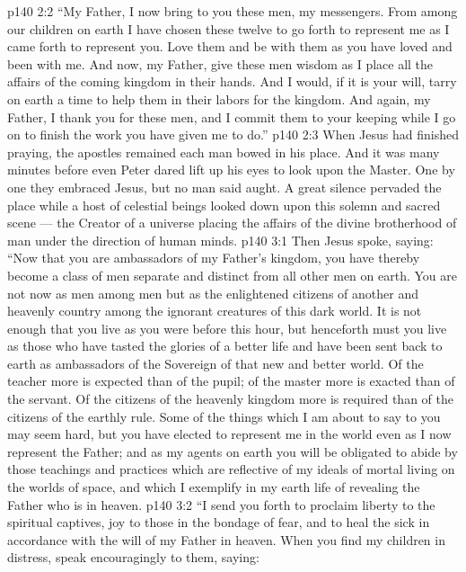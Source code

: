 \vs p140 2:2 \textcolor{ubdarkred}{“My Father, I now bring to you these men, my messengers. From among our children on earth I have chosen these twelve to go forth to represent me as I came forth to represent you. Love them and be with them as you have loved and been with me. And now, my Father, give these men wisdom as I place all the affairs of the coming kingdom in their hands. And I would, if it is your will, tarry on earth a time to help them in their labors for the kingdom. And again, my Father, I thank you for these men, and I commit them to your keeping while I go on to finish the work you have given me to do.”}
\vs p140 2:3 \pc When Jesus had finished praying, the apostles remained each man bowed in his place. And it was many minutes before even Peter dared lift up his eyes to look upon the Master. One by one they embraced Jesus, but no man said aught. A great silence pervaded the place while a host of celestial beings looked down upon this solemn and sacred scene --- the Creator of a universe placing the affairs of the divine brotherhood of man under the direction of human minds.
\vs p140 3:1 Then Jesus spoke, saying: \textcolor{ubdarkred}{“Now that you are ambassadors of my Father’s kingdom, you have thereby become a class of men separate and distinct from all other men on earth. You are not now as men among men but as the enlightened citizens of another and heavenly country among the ignorant creatures of this dark world. It is not enough that you live as you were before this hour, but henceforth must you live as those who have tasted the glories of a better life and have been sent back to earth as ambassadors of the Sovereign of that new and better world. Of the teacher more is expected than of the pupil; of the master more is exacted than of the servant. Of the citizens of the heavenly kingdom more is required than of the citizens of the earthly rule. Some of the things which I am about to say to you may seem hard, but you have elected to represent me in the world even as I now represent the Father; and as my agents on earth you will be obligated to abide by those teachings and practices which are reflective of my ideals of mortal living on the worlds of space, and which I exemplify in my earth life of revealing the Father who is in heaven.}
\vs p140 3:2 \textcolor{ubdarkred}{“I send you forth to proclaim liberty to the spiritual captives, joy to those in the bondage of fear, and to heal the sick in accordance with the will of my Father in heaven. When you find my children in distress, speak encouragingly to them, saying:}
